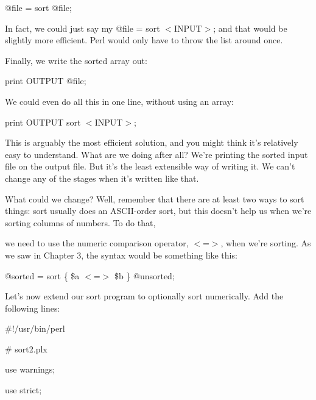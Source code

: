 \documentclass[a4paper,11pt]{book}
\begin{document}
\noindent @file = sort @file;

\noindent 

\noindent In fact, we could just say my @file = sort $<$INPUT$>$; and that would be slightly more efficient. Perl would only have to throw the list around once.

\noindent 

\noindent Finally, we write the sorted array out:

\noindent 

\noindent print OUTPUT @file;

\noindent 

\noindent We could even do all this in one line, without using an array:

\noindent 

\noindent 

\noindent print OUTPUT sort $<$INPUT$>$;

\noindent 

\noindent This is arguably the most efficient solution, and you might think it's relatively easy to understand. What are we doing after all? We're printing the sorted input file on the output file. But it's the least extensible way of writing it. We can't change any of the stages when it's written like that.

\noindent 

\noindent What could we change? Well, remember that there are at least two ways to sort things: sort usually does an ASCII-order sort, but this doesn't help us when we're sorting columns of numbers. To do that,

\noindent we need to use the numeric comparison operator, $<$=$>$, when we're sorting. As we saw in Chapter 3, the syntax would be something like this:

\noindent 

\noindent 

\noindent @sorted = sort \{ \$a $<$=$>$ \$b \} @unsorted;

\noindent 

\noindent 

\noindent Let's now extend our sort program to optionally sort numerically. Add the following lines:

\noindent 

\noindent \#!/usr/bin/perl

\noindent \# sort2.plx

\noindent use warnings;

\noindent use strict;
\end{document}
